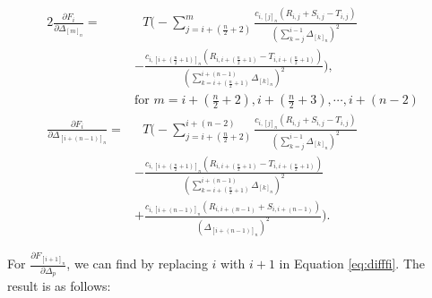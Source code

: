 \begin{alignat}{2}
\frac{\partial F_i}{\partial \Delta_{[m]_n}} =& \text{ }T \Bigg(- \sum_{j= i + (\frac{n}{2}+2)}^{m}  \frac{c_{i,[j]_n}(R_{i,j} + S_{i,j} - T_{i,j})}{(\sum_{k=j}^{i-1}\Delta_{[k]_n})^2} \nonumber \\
  &- \frac{c_{i,[i+(\frac{n}{2}+1)]_n}(R_{i,i+(\frac{n}{2}+1)} - T_{i,i+(\frac{n}{2}+1)})}{(\sum_{k=i+(\frac{n}{2}+1)}^{i+(n-1)}\Delta_{[k]_n})^2} \Bigg), \nonumber \\
 &\text{for } m = i+(\frac{n}{2}+2), i+(\frac{n}{2}+3), \cdots, i + (n-2) \nonumber \\
\frac{\partial F_i}{\partial \Delta_{[i+(n-1)]_n}} =& \text{ }T \Bigg(- \sum_{j= i + (\frac{n}{2}+ 2)}^{i+(n-2)}  \frac{c_{i,[j]_n}(R_{i,j} + S_{i,j} - T_{i,j})}{(\sum_{k=j}^{i-1}\Delta_{[k]_n})^2} \nonumber \\
  &- \frac{c_{i,[i+(\frac{n}{2}+1)]_n}(R_{i,i+(\frac{n}{2}+1)} - T_{i,i+(\frac{n}{2}+1)})}{(\sum_{k=i+(\frac{n}{2}+1)}^{i+(n-1)}\Delta_{[k]_n})^2} \nonumber \\
  &+ \frac{c_{i,[i+(n-1)]_n}(R_{i,i+(n-1)} + S_{i,i+(n-1)})}{(\Delta_{[i+(n-1)]_n})^2} \Bigg).
\label{eq:difffi}
\end{alignat}

For $\frac{\partial F_{[i+1]_n}}{\partial \Delta_p}$, we can find by replacing $i$ with $i+1$ in Equation \ref{eq:difffi}. The result is as follows:


